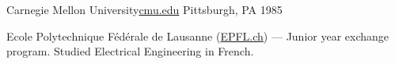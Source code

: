 
\begin{cventries}

    {Carnegie Mellon University{\enskip\cdotp\enskip}\href{http://cmu.edu}{\faGraduationCap\acvHeaderIconSep cmu.edu}} %
    {Pittsburgh, PA} %
    {1985} %
    {%
      \begin{cvitems} %
      \item {Ecole Polytechnique Fédérale de Lausanne (\href{http://epfl.ch}{EPFL.ch}) --- Junior year exchange program. Studied Electrical Engineering in French.}
      \end{cvitems}
    }

\end{cventries}
